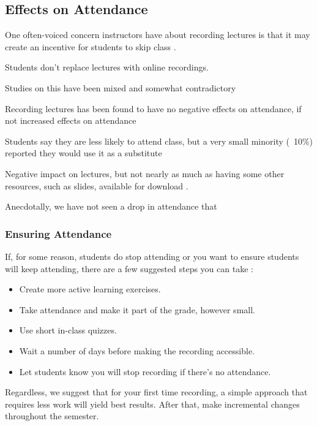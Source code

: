 \documentclass[sigconf]{acmart}
\begin{document}
\subsection{Effects on Attendance}
One often-voiced concern instructors have about recording lectures is that it may create an incentive for students to skip class \cite{larkin2010but} \cite{young2008lectures}.


Students don't replace lectures with online recordings.\cite{larkin2010but}

Studies on this have been mixed and somewhat contradictory \cite{bos2016use}


Recording lectures has been found to have no negative effects on attendance, if not increased effects on attendance \cite{shimoff2001effects}


Students say they are less likely to attend class, but a very small minority (~10\%) reported they would use it as a substitute \cite{maynor2013student}

Negative impact on lectures, but not nearly as much as having some other resources, such as slides, available for download 
\cite{traphagan2010impact}.

Anecdotally, we have not seen a drop in attendance that 

\subsubsection{Ensuring Attendance}
If, for some reason, students do stop attending or you want to ensure students will keep attending, there are a few suggested steps you can take \cite{larkin2010but} \cite{young2008lectures}:
\begin{itemize}
	\item Create more active learning exercises.
	
	\item Take attendance and make it part of the grade, however small.
	\item Use short in-class quizzes.
	\item Wait a number of days before making the recording accessible.
	\item Let students know you will stop recording if there's no attendance. 
\end{itemize}

Regardless, we suggest that for your first time recording, a simple approach that requires less work will yield best results.  
After that, make incremental changes throughout the semester.
\end{document}
